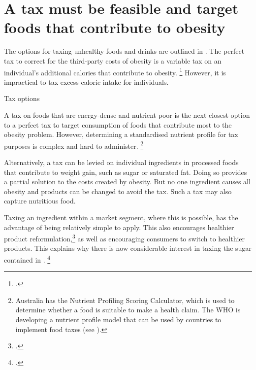 \documentclass[embargoed]{grattan}
\begin{document}
\section{A tax must be feasible and target foods that contribute to obesity }\label{a-tax-must-be-feasible-and-target-foods-that-contribute-to-obesity}

The options for taxing unhealthy foods and drinks are outlined in .
The perfect tax to correct for the third-party costs of obesity is a variable tax on an individual's additional calories that contribute to obesity.%
\footcite{Freebairn2010Taxationobesity} However, it is impractical to tax excess calorie intake for individuals.

\begin{table}
\caption{Tax options}\label{tbl:Tax-options}



\end{table}

A tax on foods that are energy-dense and nutrient poor is the next closest option to a perfect tax to target consumption of foods that contribute most to the obesity problem.
However, determining a standardised nutrient profile for tax purposes is complex and hard to administer.%
\footnote{Australia has the Nutrient Profiling Scoring Calculator, which is used to determine whether a food is suitable to make a health claim.
The WHO is developing a nutrient profile model that can be used by countries to implement food taxes (see \textcite{Organization2016FiscalPoliciesDiet}).}

Alternatively, a tax can be levied on individual ingredients in processed foods that contribute to weight gain, such as sugar or saturated fat.
Doing so provides a partial solution to the costs created by obesity.
But no one ingredient causes all obesity and products can be changed to avoid the tax. Such a tax may also capture nutritious food.

Taxing an ingredient within a market segment, where this is possible, has the advantage of being relatively simple to apply.
This also encourages healthier product reformulation,\footcite{Team2016Sugarlevyworking} as well as encouraging consumers to switch to healthier products.
This explains why there is now considerable interest in taxing the sugar contained in \SSBs{}.%
\footcites{Smith2016SoftDrinksLevy}{SouthAfricaNationalTreasury2016TaxationSugarSweetened}
\end{document}
